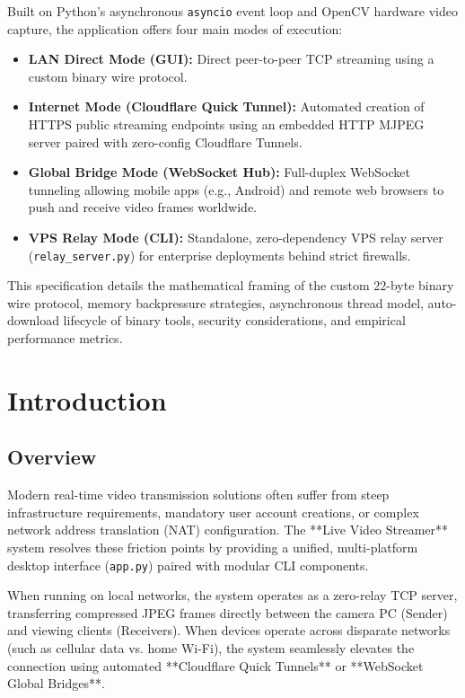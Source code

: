 \documentclass[11pt,a4paper]{article}
\begin{document}
Built on Python's asynchronous \texttt{asyncio} event loop and OpenCV hardware video capture, the application offers four main modes of execution:
\begin{itemize}[noitemsep]
    \item \textbf{LAN Direct Mode (GUI):} Direct peer-to-peer TCP streaming using a custom binary wire protocol.
    \item \textbf{Internet Mode (Cloudflare Quick Tunnel):} Automated creation of HTTPS public streaming endpoints using an embedded HTTP MJPEG server paired with zero-config Cloudflare Tunnels.
    \item \textbf{Global Bridge Mode (WebSocket Hub):} Full-duplex WebSocket tunneling allowing mobile apps (e.g., Android) and remote web browsers to push and receive video frames worldwide.
    \item \textbf{VPS Relay Mode (CLI):} Standalone, zero-dependency VPS relay server (\texttt{relay\_server.py}) for enterprise deployments behind strict firewalls.
\end{itemize}

This specification details the mathematical framing of the custom 22-byte binary wire protocol, memory backpressure strategies, asynchronous thread model, auto-download lifecycle of binary tools, security considerations, and empirical performance metrics.

\newpage

\section{Introduction}

\subsection{Overview}
Modern real-time video transmission solutions often suffer from steep infrastructure requirements, mandatory user account creations, or complex network address translation (NAT) configuration. The **Live Video Streamer** system resolves these friction points by providing a unified, multi-platform desktop interface (\texttt{app.py}) paired with modular CLI components.

When running on local networks, the system operates as a zero-relay TCP server, transferring compressed JPEG frames directly between the camera PC (Sender) and viewing clients (Receivers). When devices operate across disparate networks (such as cellular data vs. home Wi-Fi), the system seamlessly elevates the connection using automated **Cloudflare Quick Tunnels** or **WebSocket Global Bridges**.
\end{document}
